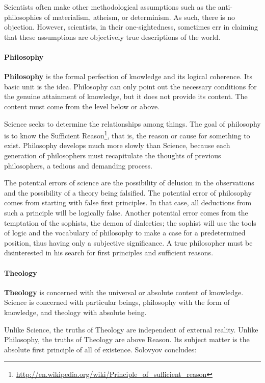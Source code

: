Scientists often make other methodological assumptions such as the anti-philosophies of materialism, atheism, or determinism. As such, there is no objection. However, scientists, in their one-sightedness, sometimes err in claiming that these assumptions are objectively true descriptions of the world.

\paragraph{Philosophy}


\textbf{Philosophy} is the formal perfection of knowledge and its logical coherence. Its basic unit is the idea. Philosophy can only point out the necessary conditions for the genuine attainment of knowledge, but it does not provide its content. The content must come from the level below or above.

Science seeks to determine the relationships among things. The goal of philosophy is to know the Sufficient Reason\footnote{\url{http://en.wikipedia.org/wiki/Principle_of_sufficient_reason}}, that is, the reason or cause for something to exist. Philosophy develops much more slowly than Science, because each generation of philosophers must recapitulate the thoughts of previous philosophers, a tedious and demanding process.

The potential errors of science are the possibility of delusion in the observations and the possibility of a theory being falsified. The potential error of philosophy comes from starting with false first principles. In that case, all deductions from such a principle will be logically false. Another potential error comes from the temptation of the sophists, the demon of dialectics; the sophist will use the tools of logic and the vocabulary of philosophy to make a case for a predetermined position, thus having only a subjective significance. A true philosopher must be disinterested in his search for first principles and sufficient reasons.

\paragraph{Theology}
\textbf{Theology} is concerned with the universal or absolute content of knowledge. Science is concerned with particular beings, philosophy with the form of knowledge, and theology with absolute being.

Unlike Science, the truths of Theology are independent of external reality. Unlike Philosophy, the truths of Theology are above Reason. Its subject matter is the absolute first principle of all of existence. Solovyov concludes:

